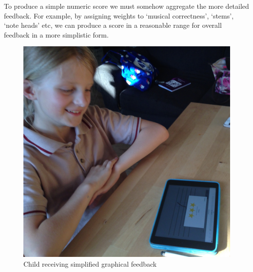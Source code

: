 To produce a simple numeric score we must somehow aggregate the more detailed feedback. For example, by assigning weights to `musical correctness', `stems', `note heads' etc, we can produce a score in a reasonable range for overall feedback in a more simplistic form.

\begin{figure}[H]
  \includegraphics[width=\linewidth]{gfx/photos/user-receiving-feedback.jpg}
  \caption{Child receiving simplified graphical feedback}
\end{figure}
\clearpage
